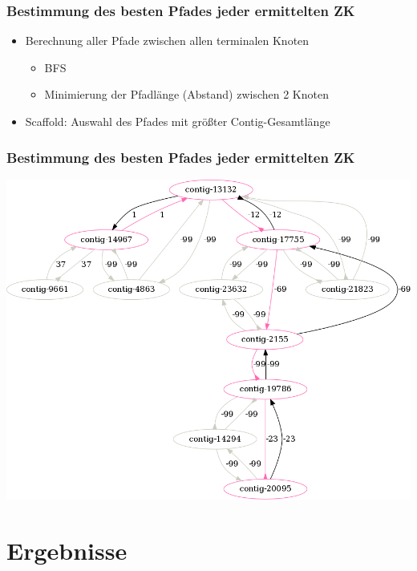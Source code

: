 \documentclass[xcolor=pst]{beamer}
\begin{document}
\begin{frame}
  \frametitle{Bestimmung des besten Pfades jeder ermittelten ZK}
  \begin{itemize}
    \item Berechnung aller Pfade zwischen allen terminalen Knoten
    \begin{itemize}
      \item BFS
      \item Minimierung der Pfadlänge (Abstand) zwischen 2 Knoten
    \end{itemize}
    \item Scaffold: Auswahl des Pfades mit größter Contig-Gesamtlänge
  \end{itemize}
\end{frame}

\begin{frame}
  \frametitle{Bestimmung des besten Pfades jeder ermittelten ZK}
  \begin{center}
    \includegraphics[scale=0.25]{figures/s_cerevisiae_make_scaffold_example_small.png}
  \end{center}
\end{frame}

\section{Ergebnisse}
\end{document}
